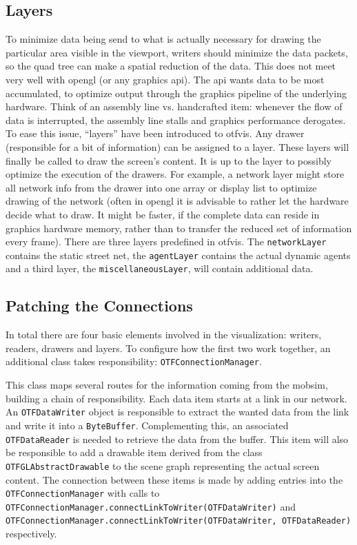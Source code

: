 \subsection{Layers}
To minimize data being send to what is actually necessary for drawing the particular area visible in the viewport, writers should minimize the data packets, so the quad tree can make a spatial reduction of the data. This does not meet very well with \gls{opengl} (or any graphics \gls{api}). The \gls{api} wants data to be most accumulated, to optimize output through the graphics pipeline of the underlying hardware. 
Think of an assembly line vs. handcrafted item: whenever the flow of data is interrupted, the assembly line stalls and graphics performance derogates. 
To ease this issue, ``layers'' have been introduced to \gls{otfvis}. 
Any drawer (responsible for a bit of information) can be assigned to a layer. 
These layers will finally be called to draw the screen's content. 
It is up to the layer to possibly optimize the execution of the drawers. 
For example, a network layer might store all network info from the drawer into one array or display list to optimize drawing of the network (often in \gls{opengl} it is advisable to rather let the hardware decide what to draw. 
It might be faster, if the complete data can reside in graphics hardware memory, rather than to transfer the reduced set of information every frame). There are three layers predefined in \gls{otfvis}. 
The \lstinline|networkLayer| contains the static street net, the \lstinline|agentLayer| contains the actual dynamic agents and a third layer, the \lstinline|miscellaneousLayer|, will contain additional data.

\subsection{Patching the Connections}
In total there are four basic elements involved in the visualization: writers, readers, drawers and layers. 
To configure how the first two work together, an additional class takes responsibility: \lstinline|OTFConnectionManager|.

This class maps several routes for the information coming from the \gls{mobsim}, building a chain of responsibility. 
Each data item starts at a link in our network. 
An \lstinline|OTFDataWriter| object is responsible to extract the wanted data from the link and write it into a \lstinline|ByteBuffer|. 
Complementing this, an associated \lstinline|OTFDataReader| is needed to retrieve the data from the buffer. 
This item will also be responsible to add a drawable item derived from the class \lstinline|OTFGLAbstractDrawable| to the scene graph representing the actual screen content. 
The connection between these items is made by adding entries into the \lstinline|OTFConnectionManager| with calls to \lstinline|OTFConnectionManager.connectLinkToWriter(OTFDataWriter)| 
and \lstinline|OTFConnectionManager.connectLinkToWriter(OTFDataWriter, OTFDataReader)| respectively.
 
